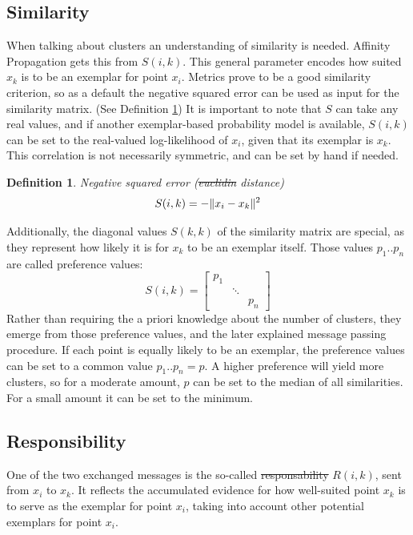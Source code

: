 \documentclass[11pt,a4paper]{article}
\newtheorem{definition}{Definition}
\DeclarePairedDelimiter\norm{\lVert}{\rVert}
\providecommand{\DIFadd}[1]{{\protect\color{blue}\uwave{#1}}} %
\providecommand{\DIFdel}[1]{{\protect\color{red}\sout{#1}}}                      %
\providecommand{\DIFaddbegin}{} %
\providecommand{\DIFaddend}{} %
\providecommand{\DIFdelbegin}{} %
\providecommand{\DIFdelend}{} %
\newcommand{\DIFscaledelfig}{0.5}
\newlength{\DIFdelgraphicswidth} %
\newlength{\DIFdelgraphicsheight} %
\newcommand{\DIFaddincludegraphics}[2][]{{\color{blue}\fbox{\DIFOincludegraphics[#1]{#2}}}} %
\newcommand{\DIFdelincludegraphics}[2][]{%
\sbox{\DIFdelgraphicsbox}{\DIFOincludegraphics[#1]{#2}}%
\settoboxwidth{\DIFdelgraphicswidth}{\DIFdelgraphicsbox} %
\settoboxtotalheight{\DIFdelgraphicsheight}{\DIFdelgraphicsbox} %
\scalebox{\DIFscaledelfig}{%
\parbox[b]{\DIFdelgraphicswidth}{\usebox{\DIFdelgraphicsbox}\\[-\baselineskip] \rule{\DIFdelgraphicswidth}{0em}}\llap{\resizebox{\DIFdelgraphicswidth}{\DIFdelgraphicsheight}{%
\setlength{\unitlength}{\DIFdelgraphicswidth}%
\begin{picture}(1,1)%
\thicklines\linethickness{2pt} %
{\color[rgb]{1,0,0}\put(0,0){\framebox(1,1){}}}%
{\color[rgb]{1,0,0}\put(0,0){\line( 1,1){1}}}%
{\color[rgb]{1,0,0}\put(0,1){\line(1,-1){1}}}%
\end{picture}%
}\hspace*{3pt}}} %
} %
\DeclareRobustCommand{\DIFaddbegin}{\DIFOaddbegin \let\includegraphics\DIFaddincludegraphics} %
\DeclareRobustCommand{\DIFaddend}{\DIFOaddend \let\includegraphics\DIFOincludegraphics} %
\DeclareRobustCommand{\DIFdelbegin}{\DIFOdelbegin \let\includegraphics\DIFdelincludegraphics} %
\DeclareRobustCommand{\DIFdelend}{\DIFOaddend \let\includegraphics\DIFOincludegraphics} %
\begin{document}
\subsection{Similarity}
When talking about clusters an understanding of similarity is needed. Affinity Propagation gets this from $S(i,k)$. This general parameter encodes how suited $x_k$ is to be an exemplar for point $x_i$. Metrics prove to be a good similarity criterion, so as a default the negative squared error can be used as input for the similarity matrix. \cite{frey2007clustering} (See Definition \ref{def:negsquared}) It is important to note that $S$ can take any real values, and if another exemplar-based probability model is available, $S(i,k)$ can be set to the real-valued log-likelihood of $x_i$, given that its exemplar is $x_k$. This correlation is not necessarily symmetric, and can be set by hand if needed. \cite{frey2007clustering}
\begin{definition}\label{def:negsquared}
	Negative squared error (\DIFdelbegin \DIFdel{euclidin }\DIFdelend \DIFaddbegin \DIFadd{euclidean }\DIFaddend distance)
	\[
		S(i,k) = - \norm{x_i - x_k}^2
	\]
\end{definition}
Additionally, the diagonal values $S(k,k)$ of the similarity matrix are special, as they represent how likely it is for $x_k$ to be an exemplar itself. Those values $p_1 .. p_n$ are called preference values:
\[
	S(i,k) = \begin{bmatrix}p_{1} & & \\ & \ddots & \\ & & p_{n}\end{bmatrix}
\]
Rather than requiring the a priori knowledge about the number of clusters, they emerge from those preference values, and the later explained message passing procedure. If each point is equally likely to be an exemplar, the preference values can be set to a common value $p_1..p_n = p$. A higher preference will yield more clusters, so for a moderate amount, $p$ can be set to the median of all similarities. For a small amount it can be set to the minimum. \cite{frey2007clustering}

\subsection{Responsibility}
One of the two exchanged messages is the so-called \DIFdelbegin \DIFdel{responsability }\DIFdelend \DIFaddbegin \DIFadd{responsibility }\DIFaddend $R(i,k)$, sent from $x_i$ to $x_k$. It reflects the accumulated evidence for how well-suited point $x_k$ is to serve as the exemplar for point $x_i$, taking into account other potential exemplars for point $x_i$. \cite{frey2007clustering}
\end{document}
